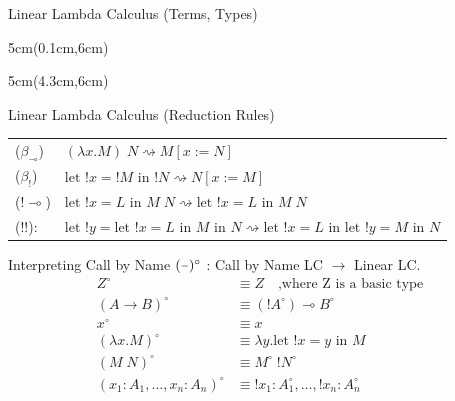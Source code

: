 \documentclass[10pt]{beamer}
\newcommand{\lam}[2]{\lambda #1 . #2}
\newcommand{\llet}[3]{\text{let }  ! #1 = #2 \text{ in } #3}
\newcommand{\app}[2]{#1 \; #2}
\newcommand{\subst}[2]{[#1 := #2]}
\newcommand{\minus}{\scalebox{0.75}[1.0]{$-$}}
\newenvironment*{inference}[2]{
  \begin{textblock*}{5cm}(#1,#2)
    \begin{prooftree}

    }
    {
    \end{prooftree}

  \end{textblock*}
}
\begin{document}
\begin{frame}[fragile]{Linear Lambda Calculus (Terms, Types)}
  \begin{inference}{0.1cm}{6cm}
  \end{inference}

  \begin{inference}{4.3cm}{6cm}
    \BIC{$\Gamma, \Delta \vdash \llet{x}{M}{N} : B$}
  \end{inference}

\end{frame}

\begin{frame}[fragile]{Linear Lambda Calculus (Reduction Rules)}
  \begin{table}
    \renewcommand{\arraystretch}{1.5} %
    \begin{tabular}{ll}
      \toprule
      ($\beta_{\multimap}$) & $\app{(\lam{x}{M})}{N} \rightsquigarrow M \subst{x}{N}$                    \\
      ($\beta_{!}$)         & $\llet{x}{! M}{! N} \rightsquigarrow N \subst{x}{M}$                       \\
      ($! \multimap$)       & $\app{\llet{x}{L}{M}}{N}  \rightsquigarrow \llet{x}{L}{\app{M}{N}}$        \\
      ($! !$):              & $\llet{y}{\llet{x}{L}{M}}{N} \rightsquigarrow \llet{x}{L}{\llet{y}{M}{N}}$ \\
      \bottomrule
    \end{tabular}
  \end{table}
\end{frame}

\begin{frame}[fragile]{Interpreting Call by Name}
  $(\minus)^\circ$ : Call by Name LC $\to$ Linear LC. \\

  \begin{align*}
    Z^\circ                             & \equiv Z \quad \text{,where Z is a basic type}     \\
    (A \rightarrow B)^\circ             & \equiv (! A^\circ) \multimap B^\circ               \\
    x^\circ                             & \equiv x                                           \\
    (\lam{x}{M})^\circ                  & \equiv \lam{y}{\llet{x}{y}{M}}                     \\
    (\app{M}{N})^\circ                  & \equiv \app{M^\circ}{! N^\circ}                    \\
    (x_1 : A_1, \dots, x_n : A_n)^\circ & \equiv ! x_1 : A_1^\circ, \dots, ! x_n : A_n^\circ \\
  \end{align*}

\end{frame}
\end{document}
